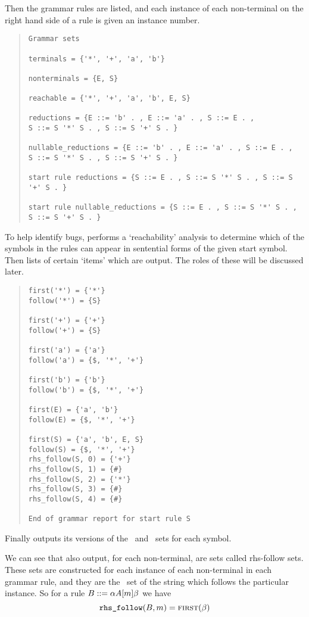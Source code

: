 Then the grammar rules are listed, and each instance
of each non-terminal on the right hand side of a rule is given an
instance number.   
{\small
\begin{quote}
\begin{verbatim}
Grammar sets

terminals = {'*', '+', 'a', 'b'}

nonterminals = {E, S}

reachable = {'*', '+', 'a', 'b', E, S}

reductions = {E ::= 'b' . , E ::= 'a' . , S ::= E . , 
S ::= S '*' S . , S ::= S '+' S . }

nullable_reductions = {E ::= 'b' . , E ::= 'a' . , S ::= E . , 
S ::= S '*' S . , S ::= S '+' S . }

start rule reductions = {S ::= E . , S ::= S '*' S . , S ::= S '+' S . }

start rule nullable_reductions = {S ::= E . , S ::= S '*' S . , 
S ::= S '+' S . }
\end{verbatim}%
\end{quote}}\noindent
To help identify bugs,
\gtb performs a `reachability' analysis to determine
which of the symbols in the rules can appear in sentential forms of
the given start symbol.
Then lists of certain `items' which are output. The roles of these 
will be discussed later. 
{\small
\begin{quote}
\begin{verbatim}
first('*') = {'*'}
follow('*') = {S}

first('+') = {'+'}
follow('+') = {S}

first('a') = {'a'}
follow('a') = {$, '*', '+'}

first('b') = {'b'}
follow('b') = {$, '*', '+'}

first(E) = {'a', 'b'}
follow(E) = {$, '*', '+'}

first(S) = {'a', 'b', E, S}
follow(S) = {$, '*', '+'}
rhs_follow(S, 0) = {'+'}
rhs_follow(S, 1) = {#}
rhs_follow(S, 2) = {'*'}
rhs_follow(S, 3) = {#}
rhs_follow(S, 4) = {#}

End of grammar report for start rule S
\end{verbatim} 
\end{quote}}\noindent
Finally \gtb outputs its versions of the \first\ and \follow\ sets for
each symbol.

We can see that also output, for each non-terminal, are sets called
rhs-follow sets. These sets are constructed for each instance of each
non-terminal in each grammar rule, and they are the \first\ set of the
string which follows the particular instance. So for a rule
$B::= \alpha A[m] \beta$ we have
$$
\verb&rhs_follow&(B,m)=\first(\beta)
$$

